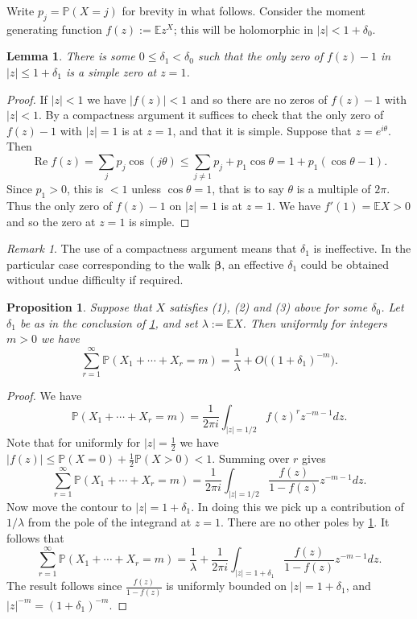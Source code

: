 \documentclass[11pt,reqno]{amsart}
\numberwithin{equation}{section}
\newtheorem{proposition}[theorem]{Proposition}
\newtheorem{lemma}[theorem]{Lemma}
\theoremstyle{definition}
\theoremstyle{remark}
\newtheorem*{remark}{Remark}
\newcommand{\mb}{\mathbb}
\newcommand{\on}{\operatorname}
\def\boldbeta{\boldsymbol\beta}
\renewcommand{\le}{\leqslant}
\renewcommand{\Re}{\on{Re}}
\begin{document}
Write $p_j = \mb{P}(X = j)$ for brevity in what follows. Consider the moment generating function $f(z) := \mb{E} z^X$; this will be holomorphic in $|z| < 1 + \delta_0$.

\begin{lemma}\label{lem11}
There is some $0 \le \delta_1 < \delta_0$ such that the only zero of $f(z) - 1$ in $|z| \le 1 + \delta_1$ is a simple zero at $z = 1$.
\end{lemma}
\begin{proof}
If $|z| < 1$ we have $|f(z)| < 1$ and so there are no zeros of $f(z) - 1$ with $|z| < 1$. By a compactness argument it suffices to check that the only zero of $f(z) - 1$ with $|z| = 1$ is at $z = 1$, and that it is simple. Suppose that $z = e^{i \theta}$. Then 
\[ \Re f(z) =  \sum_j p_j \cos (j\theta) \le \sum_{j \neq 1} p_j + p_1 \cos \theta =1 + p_1 (\cos \theta - 1).\]
   Since $p_1 > 0$, this is $< 1$ unless $\cos \theta =1$, that is to say $\theta$ is a multiple of $2 \pi$. Thus the only zero of $f(z) - 1$ on $|z| = 1$ is at $z = 1$. We have $f'(1) = \mb{E} X > 0$ and so the zero at $z = 1$ is simple.
\end{proof}

\begin{remark}
The use of a compactness argument means that $\delta_1$ is ineffective. In the particular case corresponding to the walk $\boldbeta$, an effective $\delta_1$ could be obtained without undue difficulty if required.    
\end{remark}

\begin{proposition}\label{prop12}
Suppose that $X$ satisfies \textup{(1)}, \textup{(2)} and \textup{(3)} above for some $\delta_0$. Let $\delta_1$ be as in the conclusion of \cref{lem11}, and set $\lambda := \mb{E} X$. Then uniformly for integers $m > 0$ we have
\[ \sum_{r = 1}^{\infty} \mb{P}(X_1 + \cdots + X_r =  m) = \frac{1}{\lambda} + O\big((1 + \delta_1)^{-m}\big).\] 
\end{proposition}
\begin{proof}
We have 
\[ \mb{P} (X_1 + \cdots + X_r = m) = \frac{1}{2\pi i} \int_{|z| = 1/2} f(z)^r z^{- m - 1} dz.\] 
Note that for uniformly for $|z| = \frac{1}{2}$ we have $|f(z)| \le \mb{P}(X = 0) + \frac{1}{2}\mb{P}(X > 0) < 1$. Summing over $r$ gives
\[ \sum_{r = 1}^{\infty} \mb{P}(X_1 + \cdots + X_r = m) = \frac{1}{2\pi i} \int_{|z| = 1/2} \frac{f(z)}{1 - f(z)} z^{-m - 1} dz. \]
Now move the contour to $|z| = 1 + \delta_1$. In doing this we pick up a contribution of $1/\lambda$ from the pole of the integrand at $z = 1$. There are no other poles by \cref{lem11}. It follows that 
\[ \sum_{r = 1}^{\infty} \mb{P}(X_1 + \cdots + X_r = m) = \frac{1}{\lambda} + \frac{1}{2\pi i} \int_{|z| = 1 + \delta_1} \frac{f(z)}{1 - f(z)} z^{-m - 1} dz . \] The result follows since $\frac{f(z)}{1 - f(z)}$ is uniformly bounded on $|z| = 1 + \delta_1$, and $|z|^{-m} = (1 + \delta_1)^{-m}$.
\end{proof}
\end{document}
